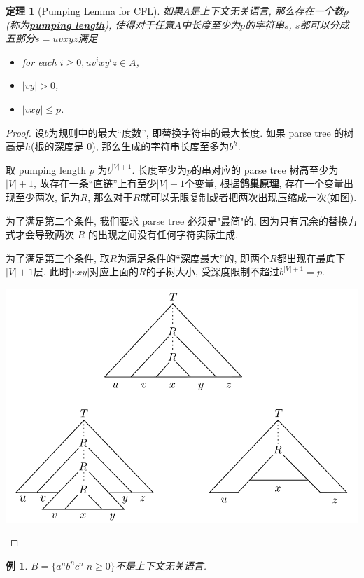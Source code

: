 \documentclass[8pt]{article}
\theoremstyle{compact}
\newtheorem{theorem}{定理}[section]
\newtheorem{example}{例}[section]
\def\obj#1{\textbf{\uline{#1}}}
\def\le{\leqslant}
\def\ge{\geqslant}
\begin{document}
\begin{theorem}[Pumping Lemma for CFL]
	如果$A$是上下文无关语言, 那么存在一个数$p$(称为\obj{pumping length}), 使得对于任意$A$中长度至少为$p$的字符串$s$, $s$都可以分成五部分$s = uvxyz$满足
	\begin{itemize}
		\item for each $i \ge 0, uv^ixy^iz \in A$,
		\item $|vy| > 0$,
		\item $|vxy| \le p$.
	\end{itemize}
\end{theorem}
\begin{proof}
	设$b$为规则中的最大“度数”, 即替换字符串的最大长度. 如果 parse tree 的树高是$h$(根的深度是 $0$), 那么生成的字符串长度至多为$b^h$. 

	取 pumping length $p$ 为$b^{|V|+1}$. 长度至少为$p$的串对应的 parse tree 树高至少为$|V| + 1$, 故存在一条“直链”上有至少$|V| + 1$个变量, 根据\obj{鸽巢原理}, 存在一个变量出现至少两次, 记为$R$, 那么对于$R$就可以无限复制或者把两次出现压缩成一次(如图). 

	为了满足第二个条件, 我们要求 parse tree 必须是"最简"的, 因为只有冗余的替换方式才会导致两次 $R$ 的出现之间没有任何字符实际生成.

	为了满足第三个条件, 取$R$为满足条件的“深度最大”的, 即两个$R$都出现在最底下$|V| + 1$层. 此时$|vxy|$对应上面的$R$的子树大小, 受深度限制不超过$b^{|V| + 1} = p$. 
	\begin{center}
		\includegraphics[scale=0.3]{pic/pumping_for_CFL.png}		
	\end{center}
\end{proof}
\begin{example}
	$B = \{a^nb^nc^n | n \ge 0\}$不是上下文无关语言.
\end{example}
\end{document}
